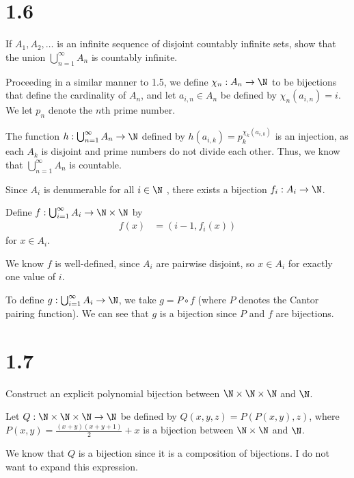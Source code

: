 \documentclass[10pt]{mypackage}
\begin{document}
\section{1.6}%
\begin{problem}
  If $A_1,A_2,\dots$ is an infinite sequence of disjoint countably infinite sets, show that the union $\bigcup_{n=1}^{\infty} A_n$ is countably infinite.
\end{problem}
\begin{solution}
  Proceeding in a similar manner to 1.5, we define $\chi_n: A_n\rightarrow \N$ to be bijections that define the cardinality of $A_n$, and let $a_{i,n}\in A_n$ be defined by $\chi_n\left(a_{i,n}\right) = i$. We let $p_n$ denote the $n$th prime number.\newline

  The function $h: \bigcup_{n=1}^{\infty}A_n\rightarrow \N$ defined by $h\left(a_{i,k}\right) = p_k^{\chi_k\left(a_{i,k}\right)}$ is an injection, as each $A_k$ is disjoint and prime numbers do not divide each other. Thus, we know that $\bigcup_{n=1}^{\infty}A_n$ is countable.
\end{solution}
{
  \color{blue}
  \begin{solution}
    Since $A_i$ is denumerable for all $i\in \N$ , there exists a bijection $f_i: A_i \rightarrow \N$.\newline

    Define $f: \bigcup_{i=1}^{\infty}A_i\rightarrow \N\times \N$ by 
    \begin{align*}
      f(x) &= \left(i-1, f_{i}\left(x\right)\right)
    \end{align*}
    for $x\in A_i$.\newline

    We know $f$ is well-defined, since $A_i$ are pairwise disjoint, so $x\in A_i$ for exactly one value of $i$.\newline

    To define $g: \bigcup_{i=1}^{\infty}A_i \rightarrow \N$, we take $g = P\circ f$ (where $P$ denotes the Cantor pairing function). We can see that $g$ is a bijection since $P$ and $f$ are bijections.
  \end{solution}
}
\section{1.7}%
\begin{problem}
  Construct an explicit polynomial bijection between $\N\times\N\times\N$ and $\N$.
\end{problem}
\begin{solution}
  Let $Q: \N\times\N\times\N \rightarrow \N$ be defined by $Q(x,y,z) = P\left(P(x,y),z\right)$, where $P(x,y) = \frac{(x+y)(x+y+1)}{2} + x$ is a bijection between $\N\times\N$ and $\N$.\newline

  We know that $Q$ is a bijection since it is a composition of bijections. I do not want to expand this expression.
\end{solution}
\end{document}
